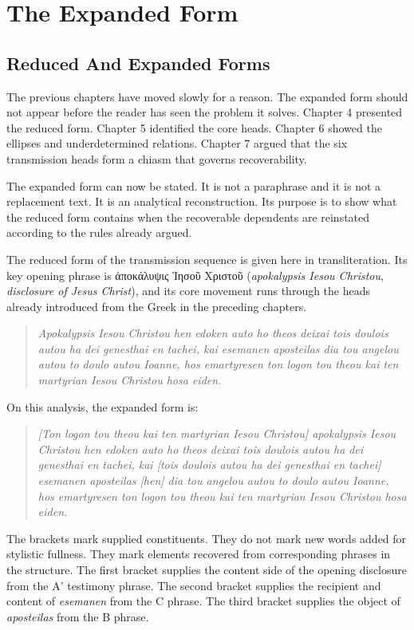 \chapter{The Expanded Form}

\section{Reduced And Expanded Forms}

The previous chapters have moved slowly for a reason. The expanded form should not appear before the reader has seen the problem it solves. Chapter 4 presented the reduced form. Chapter 5 identified the core heads. Chapter 6 showed the ellipses and underdetermined relations. Chapter 7 argued that the six transmission heads form a chiasm that governs recoverability.

The expanded form can now be stated. It is not a paraphrase and it is not a replacement text. It is an analytical reconstruction. Its purpose is to show what the reduced form contains when the recoverable dependents are reinstated according to the rules already argued.

The reduced form of the transmission sequence is given here in transliteration. Its key opening phrase is \textgreek{ἀποκάλυψις Ἰησοῦ Χριστοῦ} (\textit{apokalypsis Iesou Christou}, \textit{disclosure of Jesus Christ}), and its core movement runs through the heads already introduced from the Greek in the preceding chapters.

\begin{quote}
\textit{Apokalypsis Iesou Christou hen edoken auto ho theos deixai tois doulois autou ha dei genesthai en tachei, kai esemanen aposteilas dia tou angelou autou to doulo autou Ioanne, hos emartyresen ton logon tou theou kai ten martyrian Iesou Christou hosa eiden.}
\end{quote}

On this analysis, the expanded form is:

\begin{quote}
\textit{[Ton logon tou theou kai ten martyrian Iesou Christou] apokalypsis Iesou Christou hen edoken auto ho theos deixai tois doulois autou ha dei genesthai en tachei, kai [tois doulois autou ha dei genesthai en tachei] esemanen aposteilas [hen] dia tou angelou autou to doulo autou Ioanne, hos emartyresen ton logon tou theou kai ten martyrian Iesou Christou hosa eiden.}
\end{quote}

The brackets mark supplied constituents. They do not mark new words added for stylistic fullness. They mark elements recovered from corresponding phrases in the structure. The first bracket supplies the content side of the opening disclosure from the A' testimony phrase. The second bracket supplies the recipient and content of \textit{esemanen} from the C phrase. The third bracket supplies the object of \textit{aposteilas} from the B phrase.

